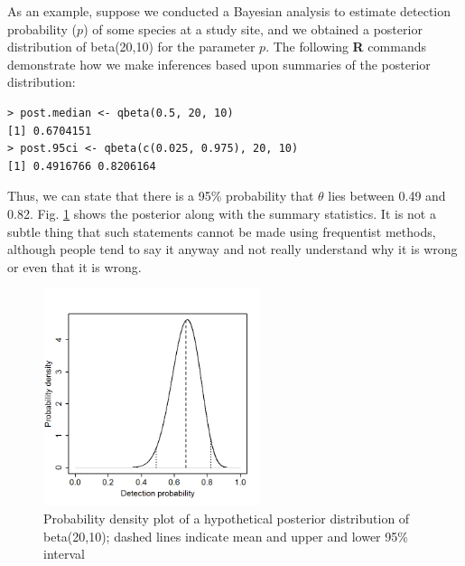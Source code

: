 As an
example, suppose we conducted a Bayesian analysis to estimate
detection probability ($p$) of some species at a study site, and we
obtained a posterior distribution of beta(20,10) for the parameter
$p$. The following {\bf R} commands demonstrate how we make inferences based
upon summaries of the posterior distribution:
\begin{verbatim}
> post.median <- qbeta(0.5, 20, 10)
[1] 0.6704151
> post.95ci <- qbeta(c(0.025, 0.975), 20, 10)
[1] 0.4916766 0.8206164
\end{verbatim}
Thus, we can state that there is a 95\% probability that $\theta$ lies
between 0.49 and 0.82. Fig. \ref{densityvsdetection.fig} shows the
posterior along with the summary statistics.
It is not a subtle thing that such statements 
cannot be made using frequentist methods, although people tend to say
it anyway and not really understand why it is wrong or even that it is
wrong. 

\begin{figure}
\begin{center}
\includegraphics[height=2.5in]{Ch3-Bayes/figs/densityvsdetection}
\end{center}
\caption{Probability density plot of a hypothetical
 posterior distribution of beta(20,10); dashed lines 
 indicate mean and upper and lower 95\% interval}
\label{densityvsdetection.fig}
\end{figure}





